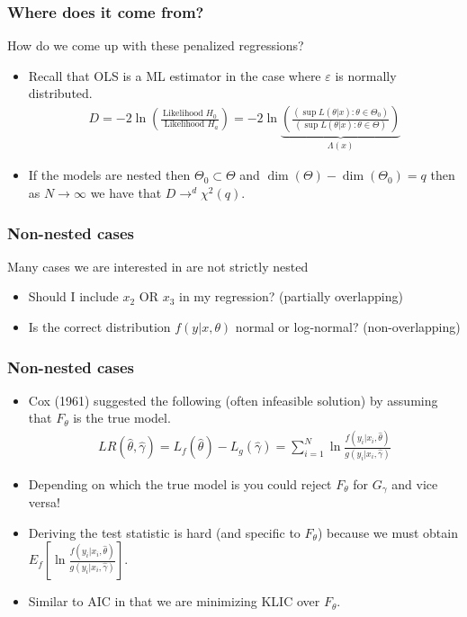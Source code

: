 \documentclass[xcolor=pdftex,dvipsnames,table,mathserif]{beamer}
\begin{document}
\begin{frame}
\frametitle{Where does it come from?}
How do we come up with these penalized regressions?
\begin{itemize}
\item Recall that OLS is a ML estimator in the case where $\varepsilon$ is normally distributed.
\begin{eqnarray*}
D = - 2 \ln \left (\frac{\mbox{Likelihood  } H_0}{\mbox{ Likelihood  }H_a} \right) = -2 \ln \underbrace{\left(\frac{(\sup L(\theta | x) : \theta \in \Theta_0)}{(\sup L(\theta | x) : \theta \in \Theta)}\right)}_{\Lambda(x)}
\end{eqnarray*}
\item If the models are \alert{nested} then $\Theta_0 \subset \Theta$ and $\dim(\Theta) -\dim(\Theta_0) = q$ then as $N\rightarrow \infty$ we have that $D \rightarrow^d \chi^2(q)$.
\end{itemize}
\end{frame}

\begin{frame}
\frametitle{Non-nested cases}
Many cases we are interested in are \alert{not strictly nested}
\begin{itemize}
\item Should I include $x_2$ OR $x_3$ in my regression? (partially overlapping)
\item Is the correct distribution $f(y | x, \theta)$ normal or log-normal? (non-overlapping)
\end{itemize}
\end{frame}

\begin{frame}
\frametitle{Non-nested cases}
\begin{itemize}
\item Cox (1961) suggested the following (often infeasible solution) by assuming that $F_{\theta}$ is the true model.
\begin{eqnarray*}
LR(\hat{\theta},\hat{\gamma}) = L_f(\hat{\theta}) - L_g (\hat{\gamma}) = \sum_{i=1}^N \ln \frac{f(y_i | x_i, \hat{\theta})}{g(y_i | x_i, \hat{\gamma})}
\end{eqnarray*}
\item Depending on which the true model is you could reject $F_{\theta}$ for $G_{\gamma}$ and vice versa!
\item Deriving the test statistic is hard (and specific to $F_{\theta}$) because we must obtain $E_f [\ln \frac{f(y_i | x_i, \hat{\theta})}{g(y_i | x_i, \hat{\gamma})}]$.
\item Similar to AIC in that we are minimizing KLIC over $F_{\theta}$.
\end{itemize}
\end{frame}
\end{document}
